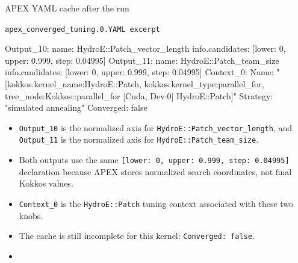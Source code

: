 \documentclass[11pt]{beamer}
\begin{document}
\begin{frame}[fragile,t]{APEX YAML cache after the run}
\begin{beamerboxesrounded}[upper=terminal title,lower=terminal body,width=\linewidth,shadow=false]{%
\textcolor{red!70}{\footnotesize\textbullet}\hspace{0.15em}%
\textcolor{yellow!80}{\footnotesize\textbullet}\hspace{0.15em}%
\textcolor{green!70!black}{\footnotesize\textbullet}\hspace{0.55em}%
\texttt{\scriptsize apex\_converged\_tuning.0.YAML excerpt}}
{\ttfamily\tiny\color{termText}
\begin{semiverbatim}
Output_10:
  name: \textcolor{green!70!black}{HydroE::Patch_vector_length}
  info.candidates: \textcolor{hotspotBlue}{[lower: 0, upper: 0.999, step: 0.04995]}
Output_11:
  name: \textcolor{green!70!black}{HydroE::Patch_team_size}
  info.candidates: \textcolor{hotspotBlue}{[lower: 0, upper: 0.999, step: 0.04995]}
Context_0:
  Name: "[kokkos.kernel_name:\textcolor{patchBlue}{HydroE::Patch},
         kokkos.kernel_type:parallel_for,
         tree_node:Kokkos::parallel_for [Cuda, Dev:0] \textcolor{patchBlue}{HydroE::Patch}]"
  Strategy: "simulated annealing"
\textcolor{hlOrange}{  Converged: false}
\end{semiverbatim}}
\end{beamerboxesrounded}

\vspace{0.1em}
\scriptsize
\begin{itemize}\itemsep0.08em
    \item \textcolor{green!70!black}{\texttt{Output\_10}} is the normalized axis for \texttt{HydroE::Patch\_vector\_length}, and \textcolor{green!70!black}{\texttt{Output\_11}} is the normalized axis for \texttt{HydroE::Patch\_team\_size}.
    \item Both outputs use the same \textcolor{hotspotBlue}{\texttt{[lower: 0, upper: 0.999, step: 0.04995]}} declaration because APEX stores normalized search coordinates, not final Kokkos values.
    \item \texttt{Context\_0} is the \texttt{HydroE::Patch} tuning context associated with these two knobs.
    \item The cache is still incomplete for this kernel: \textcolor{hlOrange}{\texttt{Converged: false}}.
    \item {}
\end{itemize}
\end{frame}
\end{document}
